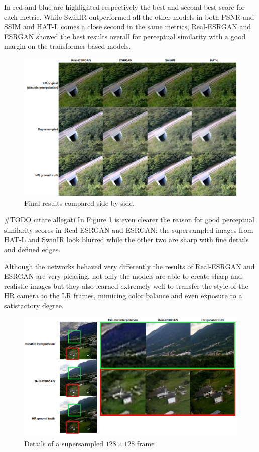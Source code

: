 In red and blue are highlighted respectively the best and second-best score for each metric. While SwinIR outperformed all the other models in both PSNR and SSIM and HAT-L comes a close second in the same metrics, Real-ESRGAN and ESRGAN showed the best results overall for perceptual similarity with a good margin on the transformer-based models.


\begin{figure}[H]

  \includegraphics[scale=0.4]{figures/results/comp_table.png}
  \caption{Final results compared side by side.}
  \label{img:comp_table}
\end{figure}
\#TODO citare allegati
In Figure \ref{img:comp_table} is even clearer the reason for good perceptual similarity scores in Real-ESRGAN and ESRGAN: the supersampled images from HAT-L and SwinIR look blurred while the other two are sharp with fine details and defined edges.

Although the networks behaved very differently the results of Real-ESRGAN and ESRGAN are very pleasing, not only the models are able to create sharp and realistic images but they also learned extremely well to transfer the style of the HR camera to the LR frames, mimicing color balance and even exposure to a satistactory degree.

\begin{figure}[H]
  \includegraphics[scale=0.3]{figures/results/realesrgan128_example_table.png}
  \caption{Details of a supersampled \(128\times128\) frame}
  \label{img:example_table}
\end{figure}

